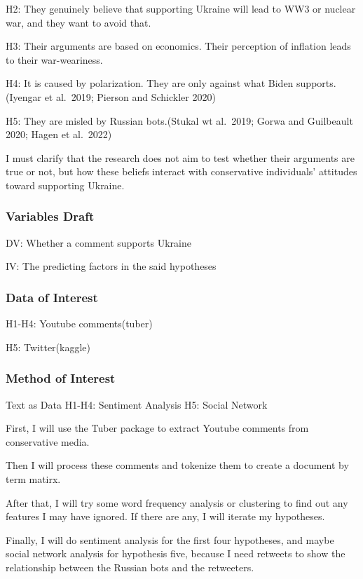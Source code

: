 \documentclass[
]{article}
\begin{document}
H2: They genuinely believe that supporting Ukraine will lead to WW3 or
nuclear war, and they want to avoid that.

H3: Their arguments are based on economics. Their perception of
inflation leads to their war-weariness.

H4: It is caused by polarization. They are only against what Biden
supports. (Iyengar et al.~2019; Pierson and Schickler 2020)

H5: They are misled by Russian bots.(Stukal wt al.~2019; Gorwa and
Guilbeault 2020; Hagen et al.~2022)

I must clarify that the research does not aim to test whether their
arguments are true or not, but how these beliefs interact with
conservative individuals' attitudes toward supporting Ukraine.

\hypertarget{variables-draft}{%
\subsubsection{Variables Draft}\label{variables-draft}}

DV: Whether a comment supports Ukraine

IV: The predicting factors in the said hypotheses

\hypertarget{data-of-interest}{%
\subsubsection{Data of Interest}\label{data-of-interest}}

H1-H4: Youtube comments(tuber)

H5: Twitter(kaggle)

\hypertarget{method-of-interest}{%
\subsubsection{Method of Interest}\label{method-of-interest}}

Text as Data H1-H4: Sentiment Analysis H5: Social Network

First, I will use the Tuber package to extract Youtube comments from
conservative media.

Then I will process these comments and tokenize them to create a
document by term matirx.

After that, I will try some word frequency analysis or clustering to
find out any features I may have ignored. If there are any, I will
iterate my hypotheses.

Finally, I will do sentiment analysis for the first four hypotheses, and
maybe social network analysis for hypothesis five, because I need
retweets to show the relationship between the Russian bots and the
retweeters.
\end{document}
